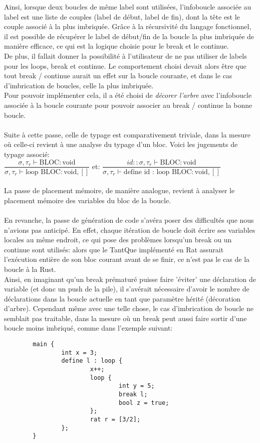 \documentclass[french]{article}
\newcommand{\jugementLoop}{
        \dfrac{\sigma, \tau_r \vdash \text{BLOC} : \text{void}}
              {\sigma, \tau_r \vdash \text{loop} \text{ BLOC} : \text{void}, []}
        }
\newcommand{\jugementLoopId}{
        \dfrac{id::\sigma, \tau_r \vdash \text{BLOC} : \text{void}}
              {\sigma, \tau_r \vdash \text{define id : loop} \text{ BLOC} : \text{void}, []}
        }
\begin{document}
Ainsi, lorsque deux boucles de même label sont utilisées, l'infoboucle associée au label est une liste de couples 
(label de début, label de fin), dont la tête est le couple associé à la plus imbriquée.
Grâce à la récursivité du langage fonctionnel, il est possible de récupérer le label de début/fin de la boucle la plus imbriquée de manière efficace,
ce qui est la logique choisie pour le break et le continue. \\
De plus, il fallait donner la possibilité à l'utilisateur de ne pas utiliser de labels pour les loops, break et continue. Le comportement
choisi devait alors être que tout break / continue aurait un effet sur la boucle courante, et dans le cas d'imbrication de boucles, celle la 
plus imbriquée.\\
Pour pouvoir implémenter cela, il a été choisi de \textit{décorer l'arbre} avec l'infoboucle associée à la boucle courante pour pouvoir associer au break / continue
la bonne boucle.\\\\
Suite à cette passe, celle de typage est comparativement triviale, dans la mesure où celle-ci revient à une analyse
du typage d'un bloc. Voici les jugements de typage associé:\\
 \(\jugementLoop\) et: \(\jugementLoopId\) \\\\
La passe de placement mémoire, de manière analogue, revient à analyser le placement mémoire des variables du bloc de la boucle.\\\\
En revanche, la passe de génération de code s'avéra poser des difficultés que nous n'avions pas anticipé. En effet, chaque itération de boucle doit
écrire ses variables locales au même endroit, ce qui pose des problèmes lorsqu'un break ou un continue sont utilisés: alors que le TantQue
implémenté en Rat assurait l'exécution entière de son bloc courant avant de se finir, ce n'est pas le cas de la boucle à la Rust. \\
Ainsi, en imaginant qu'un break prématuré puisse faire 'éviter' une déclaration de variable (et donc un push de la pile), il s'avérait nécessaire
d'avoir le nombre de déclarations dans la boucle actuelle en tant que paramètre hérité (décoration d'arbre). Cependant même avec une telle chose, 
le cas d'imbrication de boucle ne semblait pas traitable, dans la mesure où un break peut aussi faire sortir d'une boucle moins imbriqué, comme dans 
l'exemple suivant:
\begin{lstlisting}
        main {
                int x = 3;
                define l : loop {
                        x++;
                        loop {
                                int y = 5;
                                break l;
                                bool z = true;
                        };
                        rat r = [3/2];
                };
        }
\end{lstlisting}
\end{document}
